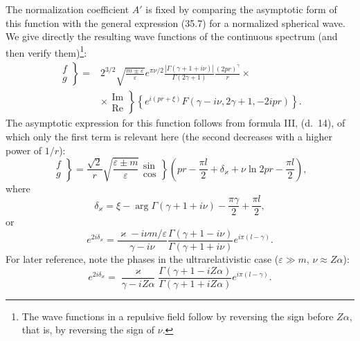 The normalization coefficient $A'$ is fixed by comparing the asymptotic form of this function with the general expression (35.7) for a normalized spherical wave. We give directly the resulting wave functions of the continuous spectrum (and then verify them)\footnote{The wave functions in a repulsive field follow by reversing the sign before $Z\alpha$, that is, by reversing the sign of $\nu$.}:
\begin{equation}
\begin{aligned}
\left.\begin{matrix}f\\g\end{matrix}\right\}
={}&2^{3/2}\sqrt{\frac{m\pm\varepsilon}{\varepsilon}}
e^{\pi\nu/2}\frac{|\Gamma(\gamma+1+i\nu)|}{\Gamma(2\gamma+1)}
\frac{(2pr)^\gamma}{r}\times{}\\
&\times\left.\begin{matrix}\operatorname{Im}\\\operatorname{Re}\end{matrix}\right\}
\left\{e^{i(pr+\xi)}F(\gamma-i\nu,2\gamma+1,-2ipr)\right\}.
\end{aligned}
\tag{36.15}
\end{equation}
The asymptotic expression for this function follows from formula III, (d.~14), of which only the first term is relevant here (the second decreases with a higher power of $1/r$):
\begin{equation}
\left.\begin{matrix}f\\g\end{matrix}\right\}
=\frac{\sqrt2}{r}\sqrt{\frac{\varepsilon\pm m}{\varepsilon}}
\left.\begin{matrix}\sin\\\cos\end{matrix}\right\}
\left(pr-\frac{\pi l}{2}+\delta_\varkappa+\nu\ln2pr-\frac{\pi l}{2}\right),
\tag{36.16}
\end{equation}
where
\begin{equation}
\delta_\varkappa=\xi-\arg\Gamma(\gamma+1+i\nu)-\frac{\pi\gamma}{2}+\frac{\pi l}{2},
\tag{36.17}
\end{equation}
or
\begin{equation}
e^{2i\delta_\varkappa}
=\frac{\varkappa-i\nu m/\varepsilon}{\gamma-i\nu}
\frac{\Gamma(\gamma+1-i\nu)}{\Gamma(\gamma+1+i\nu)}e^{i\pi(l-\gamma)}.
\tag{36.18}
\end{equation}
For later reference, note the phases in the ultrarelativistic case ($\varepsilon\gg m$, $\nu\approx Z\alpha$):
\begin{equation}
e^{2i\delta_\varkappa}
=\frac\varkappa{\gamma-iZ\alpha}
\frac{\Gamma(\gamma+1-iZ\alpha)}{\Gamma(\gamma+1+iZ\alpha)}e^{i\pi(l-\gamma)}.
\tag{36.19}
\end{equation}

